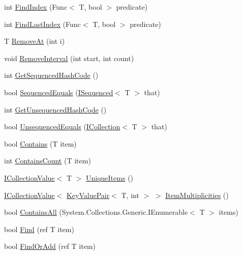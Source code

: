 \begin{DoxyCompactItemize}
\item 
int \hyperlink{class_c5_1_1_wrapped_array_a189ddcea1c7463ce3e8899e2709614d5}{Find\+Index} (Func$<$ T, bool $>$ predicate)
\item 
int \hyperlink{class_c5_1_1_wrapped_array_a7606c974ca7844dbbab61e0671f72a53}{Find\+Last\+Index} (Func$<$ T, bool $>$ predicate)
\item 
T \hyperlink{class_c5_1_1_wrapped_array_a01b30a7260874fcd043d01cabad29f55}{Remove\+At} (int i)
\item 
void \hyperlink{class_c5_1_1_wrapped_array_ae488079bb94b8ed0bdb0ce834ec2dd25}{Remove\+Interval} (int start, int count)
\item 
int \hyperlink{class_c5_1_1_wrapped_array_a00b82e37ca65bf9ea9088f5528b07fc4}{Get\+Sequenced\+Hash\+Code} ()
\item 
bool \hyperlink{class_c5_1_1_wrapped_array_a3a74f3b059b10576670618716cc3377f}{Sequenced\+Equals} (\hyperlink{interface_c5_1_1_i_sequenced}{I\+Sequenced}$<$ T $>$ that)
\item 
int \hyperlink{class_c5_1_1_wrapped_array_a9e66ede7a619e13da4307ec6c8df6c0d}{Get\+Unsequenced\+Hash\+Code} ()
\item 
bool \hyperlink{class_c5_1_1_wrapped_array_af41294d9e8203f58df120b0f551392d0}{Unsequenced\+Equals} (\hyperlink{interface_c5_1_1_i_collection}{I\+Collection}$<$ T $>$ that)
\item 
bool \hyperlink{class_c5_1_1_wrapped_array_aeff3477a858a6f79b120be3ca1fd7c40}{Contains} (T item)
\item 
int \hyperlink{class_c5_1_1_wrapped_array_a9d839f2be462e1dbda9ed69fe15a532f}{Contains\+Count} (T item)
\item 
\hyperlink{interface_c5_1_1_i_collection_value}{I\+Collection\+Value}$<$ T $>$ \hyperlink{class_c5_1_1_wrapped_array_a10749be9ab87797f2f0db77c21db2e10}{Unique\+Items} ()
\item 
\hyperlink{interface_c5_1_1_i_collection_value}{I\+Collection\+Value}$<$ \hyperlink{struct_c5_1_1_key_value_pair}{Key\+Value\+Pair}$<$ T, int $>$ $>$ \hyperlink{class_c5_1_1_wrapped_array_a71341ae57222c7e5d5f16b96b91ccf81}{Item\+Multiplicities} ()
\item 
bool \hyperlink{class_c5_1_1_wrapped_array_a2e1371765df8e9ecc8f928129ddd523f}{Contains\+All} (System.\+Collections.\+Generic.\+I\+Enumerable$<$ T $>$ items)
\item 
bool \hyperlink{class_c5_1_1_wrapped_array_ad8903faa6514226fa26155c9e2f757b2}{Find} (ref T item)
\item 
bool \hyperlink{class_c5_1_1_wrapped_array_afe18ba420f983ab2a011cde8bda43cd5}{Find\+Or\+Add} (ref T item)

\end{DoxyCompactItemize}

